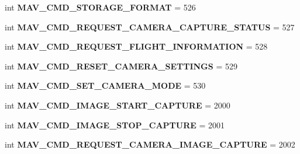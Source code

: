 \begin{DoxyCompactItemize}
\item 
\mbox{\label{namespacepymavlink_1_1dialects_1_1v10_a4f4fee35f972112cf04746ab30ec2422}} 
int {\bfseries M\+A\+V\+\_\+\+C\+M\+D\+\_\+\+S\+T\+O\+R\+A\+G\+E\+\_\+\+F\+O\+R\+M\+AT} = 526
\item 
\mbox{\label{namespacepymavlink_1_1dialects_1_1v10_a83c6d3d79cb2773da273df82436be1b3}} 
int {\bfseries M\+A\+V\+\_\+\+C\+M\+D\+\_\+\+R\+E\+Q\+U\+E\+S\+T\+\_\+\+C\+A\+M\+E\+R\+A\+\_\+\+C\+A\+P\+T\+U\+R\+E\+\_\+\+S\+T\+A\+T\+US} = 527
\item 
\mbox{\label{namespacepymavlink_1_1dialects_1_1v10_a4438bd1c5fa80444345f5989a7b5c561}} 
int {\bfseries M\+A\+V\+\_\+\+C\+M\+D\+\_\+\+R\+E\+Q\+U\+E\+S\+T\+\_\+\+F\+L\+I\+G\+H\+T\+\_\+\+I\+N\+F\+O\+R\+M\+A\+T\+I\+ON} = 528
\item 
\mbox{\label{namespacepymavlink_1_1dialects_1_1v10_a0b0b0aa8ee629cde78b5929fef87e99d}} 
int {\bfseries M\+A\+V\+\_\+\+C\+M\+D\+\_\+\+R\+E\+S\+E\+T\+\_\+\+C\+A\+M\+E\+R\+A\+\_\+\+S\+E\+T\+T\+I\+N\+GS} = 529
\item 
\mbox{\label{namespacepymavlink_1_1dialects_1_1v10_af5cad4ff19714e83d2d825e05e6ea9c8}} 
int {\bfseries M\+A\+V\+\_\+\+C\+M\+D\+\_\+\+S\+E\+T\+\_\+\+C\+A\+M\+E\+R\+A\+\_\+\+M\+O\+DE} = 530
\item 
\mbox{\label{namespacepymavlink_1_1dialects_1_1v10_a38fcd5d59827dcda293b2dd7162c26cf}} 
int {\bfseries M\+A\+V\+\_\+\+C\+M\+D\+\_\+\+I\+M\+A\+G\+E\+\_\+\+S\+T\+A\+R\+T\+\_\+\+C\+A\+P\+T\+U\+RE} = 2000
\item 
\mbox{\label{namespacepymavlink_1_1dialects_1_1v10_a3ea9910ebc9833b37c3a7b043951fc1f}} 
int {\bfseries M\+A\+V\+\_\+\+C\+M\+D\+\_\+\+I\+M\+A\+G\+E\+\_\+\+S\+T\+O\+P\+\_\+\+C\+A\+P\+T\+U\+RE} = 2001
\item 
\mbox{\label{namespacepymavlink_1_1dialects_1_1v10_ae3ae13d1ebba88bcc59ecce9d8450d2e}} 
int {\bfseries M\+A\+V\+\_\+\+C\+M\+D\+\_\+\+R\+E\+Q\+U\+E\+S\+T\+\_\+\+C\+A\+M\+E\+R\+A\+\_\+\+I\+M\+A\+G\+E\+\_\+\+C\+A\+P\+T\+U\+RE} = 2002

\end{DoxyCompactItemize}
